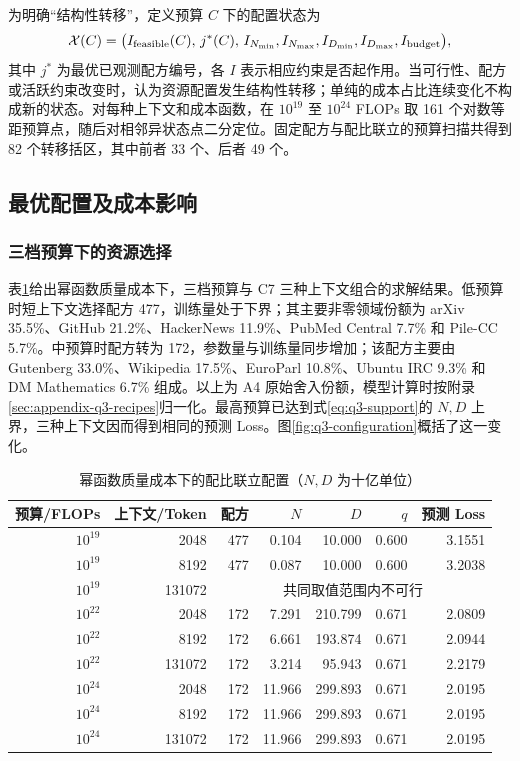 为明确“结构性转移”，定义预算 $C$ 下的配置状态为
\begin{equation}
 \mathcal X(C)=\bigl(I_{\rm feasible}(C),\,j^*(C),\,
 I_{N_{\min}},I_{N_{\max}},I_{D_{\min}},I_{D_{\max}},I_{\rm budget}\bigr),
 \label{eq:q3-state}
\end{equation}
其中 $j^*$ 为最优已观测配方编号，各 $I$ 表示相应约束是否起作用。当可行性、配方或活跃约束改变时，认为资源配置发生结构性转移；单纯的成本占比连续变化不构成新的状态。对每种上下文和成本函数，在 $10^{19}$ 至 $10^{24}$ FLOPs 取 161 个对数等距预算点，随后对相邻异状态点二分定位。固定配方与配比联立的预算扫描共得到 82 个转移括区，其中前者 33 个、后者 49 个。

\subsection{最优配置及成本影响}

\subsubsection{三档预算下的资源选择}

表\ref{tab:q3-config}给出幂函数质量成本下，三档预算与 C7 三种上下文组合的求解结果。低预算时短上下文选择配方 477，训练量处于下界；其主要非零领域份额为 arXiv 35.5\%、GitHub 21.2\%、HackerNews 11.9\%、PubMed Central 7.7\% 和 Pile-CC 5.7\%。中预算时配方转为 172，参数量与训练量同步增加；该配方主要由 Gutenberg 33.0\%、Wikipedia 17.5\%、EuroParl 10.8\%、Ubuntu IRC 9.3\% 和 DM Mathematics 6.7\% 组成。以上为 A4 原始舍入份额，模型计算时按附录\ref{sec:appendix-q3-recipes}归一化。最高预算已达到式\eqref{eq:q3-support}的 $N,D$ 上界，三种上下文因而得到相同的预测 Loss。图\ref{fig:q3-configuration}概括了这一变化。

\begin{table}[htbp]
 \centering\small
 \caption{幂函数质量成本下的配比联立配置（$N,D$ 为十亿单位）}
 \label{tab:q3-config}
 \begin{tabular}{rrrrrrr}
 \toprule
 预算/FLOPs & 上下文/Token & 配方 & $N$ & $D$ & $q$ & 预测 Loss\\
 \midrule
 $10^{19}$ & 2048 & 477 & 0.104 & 10.000 & 0.600 & 3.1551\\
 $10^{19}$ & 8192 & 477 & 0.087 & 10.000 & 0.600 & 3.2038\\
 $10^{19}$ & 131072 & \multicolumn{5}{c}{共同取值范围内不可行}\\
 $10^{22}$ & 2048 & 172 & 7.291 & 210.799 & 0.671 & 2.0809\\
 $10^{22}$ & 8192 & 172 & 6.661 & 193.874 & 0.671 & 2.0944\\
 $10^{22}$ & 131072 & 172 & 3.214 & 95.943 & 0.671 & 2.2179\\
 $10^{24}$ & 2048 & 172 & 11.966 & 299.893 & 0.671 & 2.0195\\
 $10^{24}$ & 8192 & 172 & 11.966 & 299.893 & 0.671 & 2.0195\\
 $10^{24}$ & 131072 & 172 & 11.966 & 299.893 & 0.671 & 2.0195\\
 \bottomrule
 \end{tabular}
\end{table}

